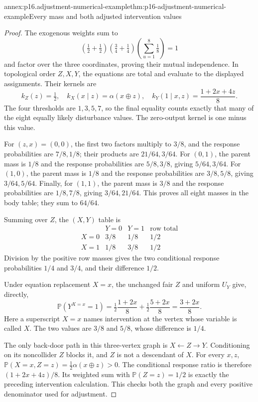 \begin{annexitem}{annex:p16.adjustment-numerical-example}{thm:p16-adjustment-numerical-example}{Every mass and both adjusted intervention values}
\begin{proof}
The exogenous weights sum to
\[
 \left(\tfrac12+\tfrac12\right)
       \left(\tfrac34+\tfrac14\right)
       \left(\sum_{u=1}^8\tfrac18\right)=1
\]
and factor over the three coordinates, proving their mutual
independence. In topological order \(Z,X,Y\), the equations are
total and evaluate to the displayed assignments. Their kernels are
\[
 k_Z(z)=\tfrac12,\quad k_X(x\mid z)=\alpha(x\oplus z),\quad
 k_Y(1\mid x,z)=\frac{1+2x+4z}{8}.
\]
The four thresholds are \(1,3,5,7\), so the final equality counts
exactly that many of the eight equally likely disturbance values.
The zero-output kernel is one minus this value.

For \((z,x)=(0,0)\), the first two factors multiply to \(3/8\),
and the response probabilities are \(7/8,1/8\); their products
are \(21/64,3/64\). For \((0,1)\), the parent mass is \(1/8\)
and the response probabilities are \(5/8,3/8\), giving
\(5/64,3/64\). For \((1,0)\), the parent mass is \(1/8\)
and the response probabilities are \(3/8,5/8\), giving
\(3/64,5/64\). Finally, for \((1,1)\), the parent mass is
\(3/8\) and the response probabilities are \(1/8,7/8\), giving
\(3/64,21/64\). This proves all eight masses in the body table;
they sum to \(64/64\).

Summing over \(Z\), the \((X,Y)\) table is
\[
\begin{array}{c|cc|c}
 &Y=0&Y=1&\text{row total}\\\hline
 X=0&3/8&1/8&1/2\\
 X=1&1/8&3/8&1/2
\end{array}
\]
Division by the positive row masses gives the two conditional response
probabilities \(1/4\) and \(3/4\), and their difference \(1/2\).

Under equation replacement \(X=x\), the unchanged fair \(Z\)
and uniform \(U_Y\) give, directly,
\[
 \mathbb P(Y^{X=x}=1)
 =\tfrac12\frac{1+2x}{8}
       +\tfrac12\frac{5+2x}{8}
 =\frac{3+2x}{8}.
\]
Here a superscript \(X=x\) names intervention at the vertex whose
variable is called \(X\). The two values are \(3/8\) and
\(5/8\), whose difference is \(1/4\).

The only back-door path in this three-vertex graph is
\(X\leftarrow Z\to Y\). Conditioning on its noncollider \(Z\)
blocks it, and \(Z\) is not a descendant of \(X\).
For every \(x,z\),
\(\mathbb P(X=x,Z=z)=\frac12\alpha(x\oplus z)>0\).
The conditional response ratio is therefore
\((1+2x+4z)/8\). Its weighted sum with \(\mathbb P(Z=z)=1/2\)
is exactly the preceding intervention calculation. This checks both
the graph and every positive denominator used for adjustment.
\end{proof}
\end{annexitem}


